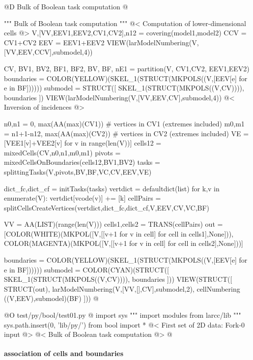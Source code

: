 \documentclass[11pt,oneside]{article}	%
\begin{document}
@D Bulk of Boolean task computation
@{""" Bulk of Boolean task computation """
@< Computation of lower-dimensional cells @>
V,[VV,EEV1,EEV2,CV1,CV2],n12 = covering(model1,model2)
CCV = CV1+CV2
EEV = EEV1+EEV2
VIEW(larModelNumbering(V,[VV,EEV,CCV],submodel,4))

CV, BV1, BV2, BF1, BF2, BV, BF, nE1 = partition(V, CV1,CV2, EEV1,EEV2)
boundaries = COLOR(YELLOW)(SKEL_1(STRUCT(MKPOLS((V,[EEV[e] for e in BF])))))
submodel = STRUCT([ SKEL_1(STRUCT(MKPOLS((V,CV)))), boundaries ])
VIEW(larModelNumbering(V,[VV,EEV,CV],submodel,4))
@< Inversion of incidences @>

n0,n1 = 0, max(AA(max)(CV1))			# vertices in CV1 (extremes included)
m0,m1 = n1+1-n12, max(AA(max)(CV2))		# vertices in CV2 (extremes included)
VE = [VEE1[v]+VEE2[v] for v in range(len(V))]
cells12 = mixedCells(CV,n0,n1,m0,m1)
pivots = mixedCellsOnBoundaries(cells12,BV1,BV2)
tasks = splittingTasks(V,pivots,BV,BF,VC,CV,EEV,VE)
	
dict_fc,dict_cf = initTasks(tasks)
vertdict = defaultdict(list)
for k,v in enumerate(V): vertdict[vcode(v)] += [k]
cellPairs = splitCellsCreateVertices(vertdict,dict_fc,dict_cf,V,EEV,CV,VC,BF)

VV = AA(LIST)(range(len(V)))
cells1,cells2 = TRANS(cellPairs)
out = [COLOR(WHITE)(MKPOL([V,[[v+1 for v in cell] for cell in cells1],None])), 
		COLOR(MAGENTA)(MKPOL([V,[[v+1 for v in cell] for cell in cells2],None]))]

boundaries = COLOR(YELLOW)(SKEL_1(STRUCT(MKPOLS((V,[EEV[e] for e in BF])))))
submodel = COLOR(CYAN)(STRUCT([ SKEL_1(STRUCT(MKPOLS((V,CV)))), boundaries ]))
VIEW(STRUCT([ STRUCT(out), larModelNumbering(V,[VV,[],CV],submodel,2), 
			cellNumbering ((V,EEV),submodel)(BF) ]))
@}


@O test/py/bool/test01.py
@{
import sys
""" import modules from larcc/lib """
sys.path.insert(0, 'lib/py/')
from bool import *
@< First set of 2D data: Fork-0 input @>
@< Bulk of Boolean task computation @>
@}


\paragraph{association of cells and boundaries}
\end{document}
